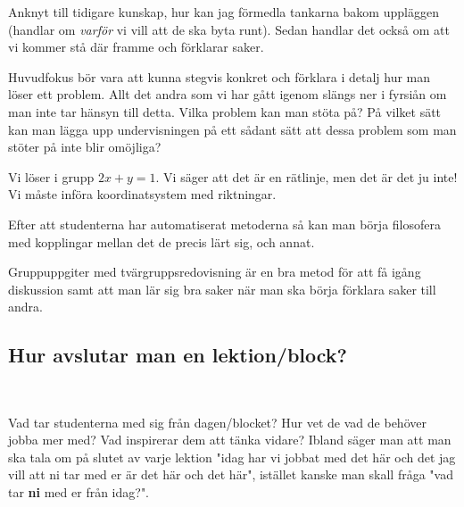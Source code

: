 \par\bigskip
\noindent Anknyt till tidigare kunskap, hur kan jag förmedla tankarna bakom uppläggen (handlar om \textit{varför} vi vill att de ska byta runt). Sedan handlar det också om att vi kommer stå där framme och förklarar saker.
\par\bigskip
\noindent Huvudfokus bör vara att kunna stegvis konkret och förklara i detalj hur man löser ett problem. Allt det andra som vi har gått igenom slängs ner i fyrsiån om man inte tar hänsyn till detta. Vilka problem kan man stöta på? På vilket sätt kan man lägga upp undervisningen på ett sådant sätt att dessa problem som man stöter på inte blir omöjliga?
\par\bigskip
\noindent Vi löser i grupp $2x+y=1$. Vi säger att det är en rätlinje, men det är det ju inte! Vi måste införa koordinatsystem med riktningar. 
\par\bigskip
\noindent Efter att studenterna har automatiserat metoderna så kan man börja filosofera med kopplingar mellan det de precis lärt sig, och annat. 
\par\bigskip
\noindent Gruppuppgiter med tvärgruppsredovisning är en bra metod för att få igång diskussion samt att man lär sig bra saker när man ska börja förklara saker till andra.
\par\bigskip
\subsection{Hur avslutar man en lektion/block?}\hfill\\
\par\bigskip
\noindent Vad tar studenterna med sig från dagen/blocket? Hur vet de vad de behöver jobba mer med? Vad inspirerar dem att tänka vidare? Ibland säger man att man ska tala om på slutet av varje lektion "idag har vi jobbat med det här och det jag vill att ni tar med er är det här och det här", istället kanske man skall fråga "vad tar \textbf{ni} med er från idag?". 
